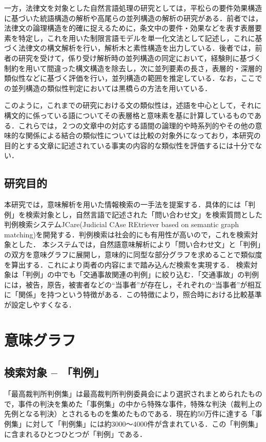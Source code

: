 一方，法律文を対象とした自然言語処理の研究としては，平松ら\cite{hiramatu}の要件効果構造に基づいた統語構造の解析や高尾ら\cite{takao}の並列構造の解析の研究がある．前者では，法律文の論理構造を的確に捉えるために，条文中の要件・効果などを表す表層要素を特定し，これを用いた制限言語モデルを単一化文法として記述し，これに基づく法律文の構文解析を行い，解析木と素性構造を出力している．後者では，前者の研究を受けて，係り受け解析時の並列構造の同定において，経験則に基づく制約を用いて間違った構文構造を除去し，次に並列要素の長さ，表層的・深層的類似性などに基づく評価を行い，並列構造の範囲を推定している．なお，ここでの並列構造の類似性判定においては黒橋らの方法を用いている．


このように，これまでの研究における文の類似性は，述語を中心として，それに構文的に係っている語についてその表層格と意味素を基に計算しているものである．これらでは，２つの文章中の対応する語間の論理的や時系列的やその他の意味的な関係による結合の類似性については比較の対象外になっており，本研究の目的とする文章に記述されている事実の内容的な類似性を評価するには十分でない．


\subsection{研究目的}
本研究では，意味解析を用いた情報検索の一手法を提案する．具体的には「判例」を検索対象とし，自然言語で記述された「問い合わせ文」を検索質問とした判例検索システムJCare(Judicial CAse REtriever based on semantic graph matching)を開発する．判例検索は社会的にも有用性が高いので，これを検索対象とした．
本システムでは，自然語意味解析により「問い合わせ文」と「判例」の双方を意味グラフに展開し，意味的に同型な部分グラフを求めることで類似度を算出する．これにより両者の内容にまで踏み込んだ検索を実現する．
検索対象は「判例」の中でも「交通事故関連の判例」に絞り込む．「交通事故」の判例には，被告，原告，被害者などの``当事者''が存在し，それぞれの``当事者''が相互に「関係」を持つという特徴がある．この特徴により，照合時における比較基準が設定しやすくなる．

\section{意味グラフ}
\subsection{検索対象 -- 「判例」}
「最高裁判所判例集」は最高裁判所判例委員会により選択されまとめられたもので，事件の判決を集めた「事例集」の中から特殊な事件，特殊な判決（裁判上の先例となる判決）とされるものを集めたものである．現在約50万件に達する「事例集」に対して「判例集」には約3000〜4000件が含まれている．この「判例集」に含まれるひとつひとつが「判例」である．

